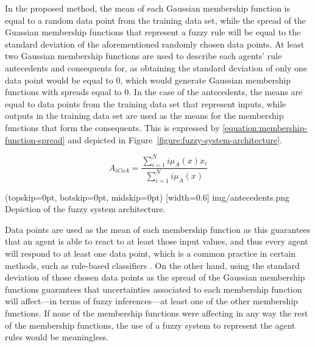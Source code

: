 \documentclass{ieeeaccess}
\begin{document}
In the proposed method, the mean of each Gaussian
membership function is equal to a random data point from the training data set,
while the spread of the Guassian membership functions that represent a fuzzy
rule will be equal to the standard deviation of the aforementioned
randomly chosen data points. At least two Gaussian membership
functions are used to describe each agents' rule antecedents and
consequents for, as obtaining the standard deviation of only one data
point would be equal to 0, which would generate Gaussian membership
functions with spreads equal to 0.
In the case of the antecedents, the means are equal to data
points from the training data set that represent inputs, while outputs in the
training data set are used as the means for the membership functions that form
the consequents. This is expressed by
\ref{equation:membership-function-spread} and depicted in
Figure~\ref{figure:fuzzy-system-architecture}.

\begin{equation}
  \label{equation:membership-function-spread}
  A_{iCoA} = \dfrac{\sum_{i=1}^{N} i\mu_{A}(x) x_{i}}{\sum_{i=1}^{N}
    i\mu_{A}(x)}
\end{equation}

\Figure[](topskip=0pt, botskip=0pt, midskip=0pt)
[width=0.6\linewidth]
{img/antecedents.png}
{Depiction of the fuzzy system architecture.
  \label{figure:fuzzy-system-architecture}}

Data points are used as the mean of each membership function as this
guarantees that an agent is able to react to at least those input
values, and thus every agent will respond to at least one data point,
which is a common practice in certain methods, such as rule-based
classifiers \cite{zhao2009building} \cite{almutairi2018rule}. On the
other hand, using the standard deviation of those chosen data points
as the spread of the Gaussian membership functions guarantees that
uncertainties associated to each membership function will affect---in
terms of fuzzy inferences---at least one of the other membership
functions. If none of the membership functions were affecting in any
way the rest of the membership functions, the use of a fuzzy system to
represent the agent rules would be meaningless.

\end{document}
